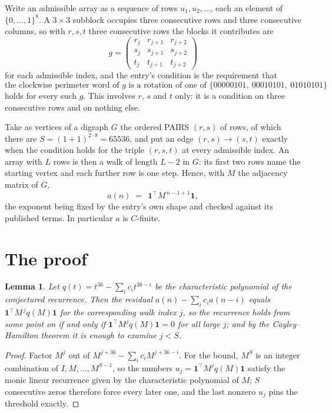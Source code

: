 \documentclass[11pt,a4paper]{article}
\theoremstyle{plain}
\newtheorem{lemma}[theorem]{Lemma}
\theoremstyle{definition}
\begin{document}
Write an admissible array as a sequence of rows $u_1,u_2,\dots$, each an element of
$\{0,\dots,1\}^{8}$. A $3\times3$ subblock occupies three consecutive rows and
three consecutive columns, so with $r,s,t$ three consecutive rows the blocks it
contributes are
\[
g=\begin{pmatrix}r_j&r_{j+1}&r_{j+2}\\ s_j&s_{j+1}&s_{j+2}\\ t_j&t_{j+1}&t_{j+2}\end{pmatrix}
\]
for each admissible index, and the entry's condition is the requirement that
\[
\text{the clockwise perimeter word of }g\text{ is a rotation of one of }\{00000101,\ 00010101,\ 01010101\}
\]
holds for every such $g$. This involves $r$, $s$ and $t$ only: it is a condition on
three consecutive rows and on nothing else.

Take as vertices of a digraph $G$ the ordered PAIRS $(r,s)$ of rows, of which there are
$S=(1+1)^{2\cdot8}=65536$, and put an edge $(r,s)\to(s,t)$ exactly when the condition
holds for the triple $(r,s,t)$ at every admissible index. An array with $L$ rows is then a
walk of length $L-2$ in $G$: its first two rows name the starting vertex and each further
row is one step. Hence, with $M$ the adjacency matrix of $G$,
\[
a(n)\;=\;\,\mathbf{1}^{\!\top}M^{\,n-1+1}\mathbf{1},
\]
the exponent being fixed by the entry's own shape and checked against its published terms.
In particular $a$ is $C$-finite.

\section{The proof}

\begin{lemma}\label{lem:crit}
Let $q(t)=t^{36}-\sum_i c_it^{36-i}$ be the characteristic polynomial of the
conjectured recurrence. Then the residual $a(n)-\sum_ic_ia(n-i)$ equals
$\mathbf{1}^{\!\top}M^{\,j}q(M)\mathbf{1}$ for the corresponding walk index
$j$, so the recurrence holds from some point on if and only if
$\mathbf{1}^{\!\top}M^{j}q(M)\mathbf{1}=0$ for all large $j$; and by the
Cayley--Hamilton theorem it is enough to examine $j<S$.
\end{lemma}

\begin{proof}
Factor $M^{j}$ out of $M^{j+36}-\sum_ic_iM^{j+36-i}$. For the bound, $M^{S}$
is an integer combination of $I,M,\dots,M^{S-1}$, so the numbers
$u_j=\mathbf{1}^{\!\top}M^{j}q(M)\mathbf{1}$ satisfy the monic linear recurrence given by
the characteristic polynomial of $M$; $S$ consecutive zeros therefore force every later one,
and the last nonzero $u_j$ pins the threshold exactly.
\end{proof}
\end{document}
